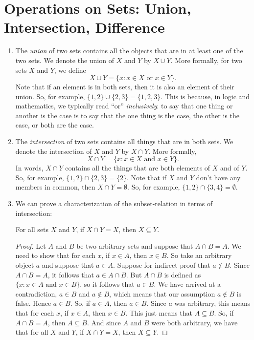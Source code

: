 \section{Operations on Sets: Union, Intersection, Difference}

\begin{enumerate}[\thesection.1]

\item The \emph{union} of two sets contains all the objects that are in at least one of the two sets. We denote the union of $X$ and $Y$ by $X\cup Y$. More formally, for two sets $X$ and $Y$, we define \[X\cup Y=\{x: x\in X\text{ or }x\in Y\}.\] Note that  if an element is in both sets, then it is also an element of their union. So, for example, $\{1,2\}\cup \{2,3\}=\{1,2,3\}$. This is because, in logic and mathematics, we typically read ``or'' \emph{inclusively}: to say that one thing or another is the case is to say that the one thing is the case, the other is the case, or both are the case.

\item The \emph{intersection} of two sets contains all things that are in both sets. We denote the intersection of $X$ and $Y$ by $X\cap Y$. More formally, \[X\cap Y=\{x:x\in X\text{ and }x\in Y\}.\] In words, $X\cap Y$ contains all the things that are both elements of $X$ and of $Y$. So, for example, $\{1,2\}\cap \{2,3\}=\{2\}$. Note that if $X$ and $Y$ don't have any members in common, then $X\cap Y=\emptyset$. So, for example, $\{1,2\}\cap \{3,4\}=\emptyset$.

\item We can prove a characterization of the subset-relation in terms of intersection:
\begin{proposition}
For all sets $X$ and $Y$, if $X\cap Y=X$, then $X\subseteq Y$.
\end{proposition}
\begin{proof}
Let $A$ and $B$ be two arbitrary sets and suppose that $A\cap B=A$. We need to show that for each $x$, if $x\in A$, then $x\in B$. So take an arbitrary object $a$ and suppose that $a\in A$. Suppose for indirect proof that $a\notin B$. Since $A\cap B=A$, it follows that $a\in A\cap B$. But $A\cap B$ is defined as $\{x:x\in A\text{ and }x\in B\}$, so it follows that $a\in B$. We have arrived at a contradiction, $a\in B$ and $a\notin B$, which means that our assumption $a\notin B$ is false. Hence $a\in B$. So, if $a\in A$, then $a\in B$. Since $a$ was arbitrary, this means that for each  $x$, if $x\in A$, then $x\in B$. This just means that $A\subseteq B$. So, if $A\cap B=A$, then $A\subseteq B$. And since $A$ and $B$ were both arbitrary, we have that for all  $X$ and $Y$, if $X\cap Y=X$, then $X\subseteq Y$.
\end{proof}


\end{enumerate}
